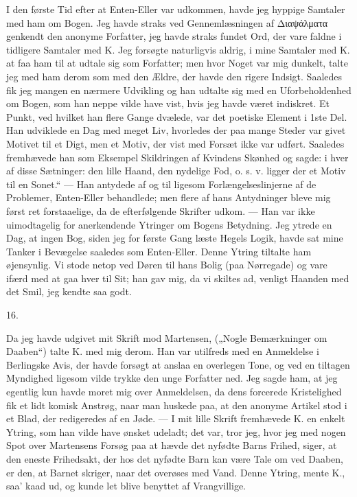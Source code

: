 \documentclass[12pt,a4paper,openany]{book}
\newcommand{\secnum}[1]{\par\begin{center}#1\end{center}\par\nobreak}
\newcommand{\opage}[1]{\marginnote{\footnotesize\textit{[#1]}}}
\begin{document}
I den første Tid efter at Enten-Eller var udkommen, havde jeg
hyppige Samtaler med ham om Bogen. Jeg havde straks ved
Gennemlæsningen af Διαψάλματα genkendt den anonyme Forfatter, jeg
havde straks fundet Ord, der vare faldne i tidligere Samtaler med
K. Jeg forsøgte naturligvis aldrig, i mine Samtaler med K. at faa
ham til at udtale sig som Forfatter; men hvor Noget var mig
dunkelt, talte jeg med ham derom som med den Ældre, der havde den
rigere Indsigt. Saaledes fik jeg mangen en nærmere Udvikling og
han udtalte sig med en Uforbeholdenhed om Bogen, som han neppe
vilde have vist, hvis jeg havde været indiskret. Et Punkt, ved
hvilket han flere Gange dvælede, var det poetiske Element i 1ste
Del. Han udviklede en Dag med meget Liv, hvorledes der paa mange
Steder var givet Motivet til et Digt, men et Motiv, der vist med
Forsæt ikke var udført. Saaledes fremhævede han som Eksempel
Skildringen af Kvindens Skønhed og sagde:
i hver af disse Sætninger: den lille Haand, den nydelige Fod, o.
s. v. ligger der et Motiv til en Sonet.“ --- Han antydede af
\opage{349}og til ligesom Forlængelseslinjerne af de Problemer,
Enten-Eller behandlede; men flere af hans Antydninger bleve mig
først ret forstaaelige, da de efterfølgende Skrifter udkom. --- Han
var ikke uimodtagelig for anerkendende Ytringer om Bogens
Betydning. Jeg ytrede en Dag, at ingen Bog, siden jeg for første
Gang læste Hegels Logik, havde sat mine Tanker i Bevægelse
saaledes som Enten-Eller. Denne Ytring tiltalte ham øjensynlig. Vi
stode netop ved Døren til hans Bolig (paa Nørregade) og vare ifærd
med at gaa hver til Sit; han gav mig, da vi skiltes ad, venligt
Haanden med det Smil, jeg kendte saa godt.

\secnum{16.}

Da jeg havde udgivet mit Skrift mod Martensen, („Nogle
Bemærkninger om Daaben“) talte K. med mig derom. Han var utilfreds
med en Anmeldelse i Berlingske Avis, der havde forsøgt at anslaa
en overlegen Tone, og ved en tiltagen Myndighed ligesom vilde
trykke den unge Forfatter ned. Jeg sagde ham, at jeg egentlig kun
havde moret mig over Anmeldelsen, da dens forcerede Kristelighed
fik et lidt komisk Anstrøg, naar man huskede paa, at den anonyme
Artikel stod i et Blad, der redigeredes af en Jøde. --- I mit lille
Skrift fremhævede K. en enkelt Ytring, som han vilde have ønsket
udeladt; det var, tror jeg, hvor jeg med nogen Spot over
Martensens Forsøg paa at hævde det nyfødte Barns Frihed, siger, at
den eneste Frihedsakt, der hos det nyfødte Barn kan være Tale om
ved Daaben, er den, at Barnet skriger, naar det overøses med Vand.
Denne Ytring, mente K., saa’ kaad ud, og kunde let blive benyttet
af Vrangvillige.
\end{document}
